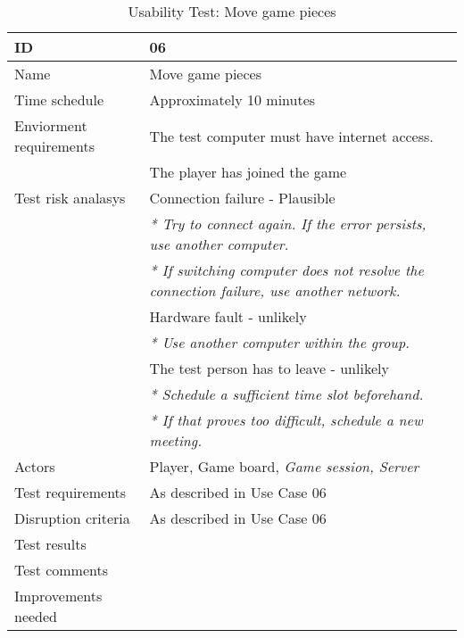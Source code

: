 {\footnotesize
\begin{table}[H]
\begin{tabular}{| p{5cm} | p{10cm} |}\hline
	\textbf{ID}	& \textbf{06} \\ \hline
	Name		& Move game pieces\\ \hline
	Time schedule	& Approximately 10 minutes\\ \hline
	Enviorment requirements 
		& The test computer must have internet access. \\ 
		& The player has joined the game\\ \hline
	Test risk analasys 
		& Connection failure - Plausible \\
		& \emph{* Try to connect again. If the error persists, use another computer.} \\
		& \emph{* If switching computer does not resolve the connection failure, use another network.}\\
		& Hardware fault - unlikely \\
		& \emph{* Use another computer within the group.} \\
		& The test person has to leave - unlikely \\
		& \emph{* Schedule a sufficient time slot beforehand.} \\
		& \emph{* If that proves too difficult, schedule a new meeting.}\\ \hline
	Actors	& Player, Game board, \emph{Game session, Server}\\ \hline
	Test requirements & As described in Use Case 06 \\ \hline
	Disruption criteria & As described in Use Case 06  \\ \hline
	Test results 
		& \\ \hline
	Test comments
		& \\ \hline
	Improvements needed
		& \\ \hline
\end{tabular}


\caption{Usability Test: Move game pieces}
\label{fig:usability_test_6}
\end{table}}


